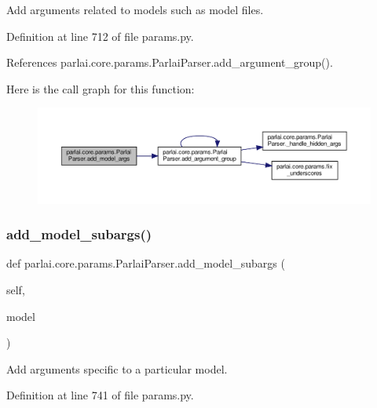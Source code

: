 \begin{DoxyVerb}Add arguments related to models such as model files.\end{DoxyVerb}
 

Definition at line 712 of file params.\+py.



References parlai.\+core.\+params.\+Parlai\+Parser.\+add\+\_\+argument\+\_\+group().

Here is the call graph for this function\+:
\nopagebreak
\begin{figure}[H]
\begin{center}
\leavevmode
\includegraphics[width=350pt]{classparlai_1_1core_1_1params_1_1ParlaiParser_af05d40e27abb0740948fdccfde5b8808_cgraph}
\end{center}
\end{figure}
\mbox{\label{classparlai_1_1core_1_1params_1_1ParlaiParser_a46c57cd479d8780c4c22aecb3135d5fe}} 
\subsubsection{\texorpdfstring{add\+\_\+model\+\_\+subargs()}{add\_model\_subargs()}}
{\footnotesize\ttfamily def parlai.\+core.\+params.\+Parlai\+Parser.\+add\+\_\+model\+\_\+subargs (\begin{DoxyParamCaption}\item[{}]{self,  }\item[{}]{model }\end{DoxyParamCaption})}

\begin{DoxyVerb}Add arguments specific to a particular model.\end{DoxyVerb}
 

Definition at line 741 of file params.\+py.



